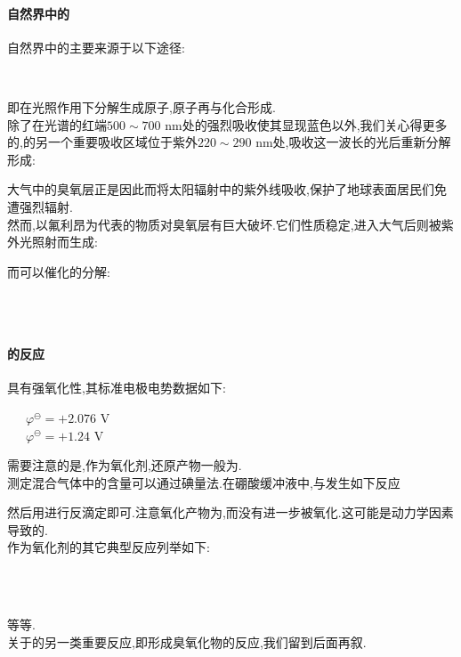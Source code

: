 \documentclass{ctexart}
\begin{document}
\paragraph{自然界中的}自然界中的主要来源于以下途径:
\begin{center}
    \\
\end{center}
即在光照作用下分解生成原子,原子再与化合形成.\\
\indent 除了在光谱的红端$500\sim700\text{ nm}$处的强烈吸收使其显现蓝色以外,我们关心得更多的,的另一个重要吸收区域位于紫外$220\sim290\text{ nm}$处,吸收这一波长的光后重新分解形成:
\begin{center}
\end{center}
大气中的臭氧层正是因此而将太阳辐射中的紫外线吸收,保护了地球表面居民们免遭强烈辐射.\\
\indent 然而,以氟利昂为代表的物质对臭氧层有巨大破坏.它们性质稳定,进入大气后则被紫外光照射而生成:
\begin{center}
\end{center}
而可以催化的分解:
\begin{center}
    \\
    \\
\end{center}
\paragraph{的反应}
具有强氧化性,其标准电极电势数据如下:
\begin{center}
    \ \ \ $\varphi^\ominus=+2.076\text{ V}$\\
    \ \ \ $\varphi^\ominus=+1.24\text{ V}$
\end{center}
需要注意的是,作为氧化剂,还原产物一般为.\\
\indent 测定混合气体中的含量可以通过碘量法.在硼酸缓冲液中,与发生如下反应
\begin{center}
\end{center}
然后用进行反滴定即可.注意氧化产物为,而没有进一步被氧化.这可能是动力学因素导致的.\\
\indent {}作为氧化剂的其它典型反应列举如下:
\begin{center}
    \\
    \\
\end{center}
等等.\\
\indent 关于的另一类重要反应,即形成臭氧化物的反应,我们留到后面再叙.
\end{document}
